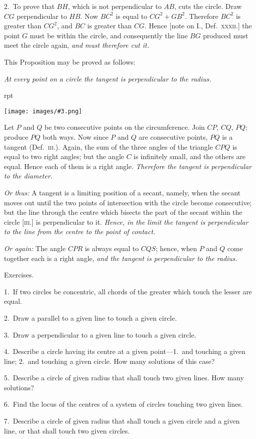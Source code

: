 \documentclass[oneside]{book}
\newcounter{wrapwidth}
\newcommand\exhead[1]{
\Needspace*{5\baselineskip}\begin{center}
\textsf{#1}
\end{center}
}
\newcommand\imgflow[3]{
\setcounter{wrapwidth}{#1}
\begin{wrapfigure}[#2]{r}{\value{wrapwidth}pt}
\begin{center}
\vspace{-0.3in}
\texttt{[image: images/\#3.png]}
\end{center}
\end{wrapfigure}
}
\begin{document}
2.~To prove that $BH$, which is not perpendicular to
$AB$, cuts the circle. Draw $CG$ perpendicular to $HB$.
Now $BC^{2}$ is equal to $CG^{2} + GB^{2}$. Therefore $BC^{2}$ is
greater than $CG^{2}$, and $BC$ is greater than $CG$. Hence
[note on I., Def.~\textsc{xxxii.}] the point $G$ must be within
the circle, and consequently the line $BG$ produced
must meet the circle again, \emph{and must therefore cut it.}

This Proposition may be proved as follows:

\emph{At every point on a circle the tangent is perpendicular
to the radius.}


\imgflow{96}{7}{f122}
Let $P$ and $Q$ be two consecutive points on the circumference.
Join $CP$, $CQ$, $PQ$;
produce $PQ$ both ways. Now since
$P$ and $Q$ are consecutive points, $PQ$
is a tangent (Def.~\textsc{iii.}). Again, the
sum of the three angles of the triangle
$CPQ$ is equal to two right
angles; but the angle $C$ is infinitely
small, and the others are equal.
Hence each of them is a right angle. \textit{Therefore the
tangent is perpendicular to the diameter.}

\textit{Or thus:} A tangent is a limiting position of a secant,
namely, when the secant moves out until the two
points of intersection with the circle become consecutive;
but the line through the centre which bisects
the part of the secant within the circle [\textsc{iii.}] is perpendicular
to it. \textit{Hence, in the limit the tangent is
perpendicular to the line from the centre to the point
of contact.}

\textit{Or again:} The angle $CPR$ is always equal to $CQS$;
hence, when $P$ and $Q$ come together each is a right
angle, \textit{and the tangent is perpendicular to the radius.}

\exhead{Exercises.}

\begin{footnotesize}
1.~If two circles be concentric, all chords of the greater which
touch the lesser are equal.

2.~Draw a parallel to a given line to touch a given circle.

3.~Draw a perpendicular to a given line to touch a given
circle.

4.~Describe a circle having its centre at a given point---1.~and
touching a given line; 2.~and touching a given circle. How
many solutions of this case?

5.~Describe a circle of given radius that shall touch two given
lines. How many solutions?

6.~Find the locus of the centres of a system of circles touching
two given lines.

7.~Describe a circle of given radius that shall touch a given
circle and a given line, or that shall touch two given circles.
\par\end{footnotesize}
\end{document}
